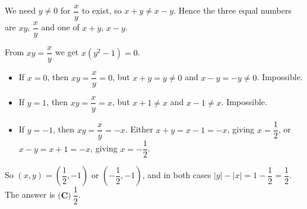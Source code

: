 We need $y\ne0$ for $\dfrac {x}{y}$ to exist, so $x+y\ne x-y$. Hence the three equal numbers are $xy$, $\dfrac {x}{y}$ and one of $x+y$, $x-y$.

From $xy=\dfrac {x}{y}$ we get $x\left(y^2-1\right)=0$.
\begin{itemize}
\item If $x=0$, then $xy=\dfrac {x}{y}=0$, but $x+y=y\ne0$ and $x-y=-y\ne0$. Impossible.
\item If $y=1$, then $xy=\dfrac {x}{y}=x$, but $x+1\ne x$ and $x-1\ne x$. Impossible.
\item If $y=-1$, then $xy=\dfrac {x}{y}=-x$. Either $x+y=x-1=-x$, giving $x=\dfrac{1}{2}$, or $x-y=x+1=-x$, giving $x=-\dfrac{1}{2}$.
\end{itemize}
So $(x,y)=\left(\dfrac{1}{2},-1\right)$ or $\left(-\dfrac{1}{2},-1\right)$, and in both cases $|y|-|x|=1-\dfrac{1}{2}=\dfrac{1}{2}$. The answer is $\boxed{\textbf{(C)}\ \dfrac{1}{2}}$.
